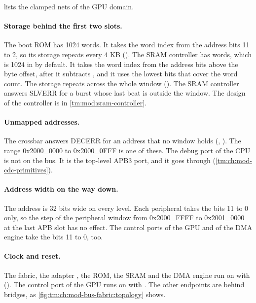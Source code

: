  lists the clamped nets of the GPU domain.

\paragraph{Storage behind the first two slots.} The boot ROM  has 1024 words. It takes the word index from the address bits 11 to 2, so its storage repeats every 4 KB (). The SRAM controller  has  words, which is 1024 in  by default. It takes the word index from the address bits above the byte offset, after it subtracts , and it uses the lowest bits that cover the word count. The storage repeats across the whole window (). The SRAM controller answers SLVERR for a burst whose last beat is outside the window. The design of the controller is in \cref{tm:mod:sram-controller}.

\paragraph{Unmapped addresses.} The crossbar answers DECERR for an address that no window holds (, ). The range 0x2000\_0000 to 0x2000\_0FFF is one of these. The debug port of the CPU is not on the bus. It is the top-level APB3 port, and it goes through  (\cref{tm:ch:mod-cdc-primitives}).

\paragraph{Address width on the way down.} The address is 32 bits wide on every level. Each peripheral takes the bits 11 to 0 only, so the step of the peripheral window from 0x2000\_FFFF to 0x2001\_0000 at the last APB slot has no effect. The control ports of the GPU and of the DMA engine take the bits 11 to 0, too.

\paragraph{Clock and reset.} The fabric, the adapter , the ROM, the SRAM and the DMA engine run on  with  (). The control port of the GPU runs on  with . The other endpoints are behind bridges, as \cref{fig:tm:ch:mod-bus-fabric:topology} shows.

